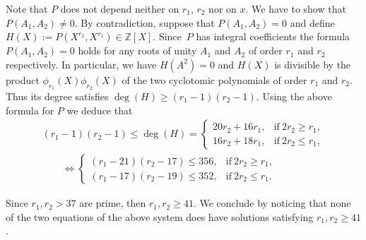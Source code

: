 Note that $P$ does not depend neither on $r_1$, $r_2$ nor on $x$. We have to show that $P(A_1,A_2)\neq 0$. By contradiction, suppose that $P(A_1, A_2)=0$ and define $H(X):=P(X^{r_2}, X^{r_1})\in \mathbb{Z}[X]$. Since~$P$ has integral coefficients the formula $P(A_1,A_2)=0$ holds for any roots of unity $A_1$ and $A_2$ of order $r_1$ and $r_2$ respectively. In particular, we have $H(A^2)=0$ and $H(X)$ is divisible by the product $\phi_{r_1}(X)\phi_{r_2}(X)$ of the two cyclotomic polynomials of order $r_1$ and $r_2$. Thus its degree satisfies $\deg (H) \geq (r_1-1)(r_2-1)$. Using the above formula for $P$ we deduce that
\begin{gather*}
 (r_1-1)(r_2-1) \leq \deg (H) = \begin{cases}
20r_2+16r_1, & \text{if} \ 2r_2\geq r_1, \\
16r_2 +18r_1, &\text{if} \ 2r_2\leq r_1,
\end{cases}\\
\qquad {} \Leftrightarrow
 \begin{cases}
(r_1-21)(r_2-17)\leq 356, & \text{if} \ 2r_2\geq r_1, \\
(r_1-17)(r_2-19)\leq 352, &\text{if} \ 2r_2\leq r_1.
\end{cases}
\end{gather*}

Since $r_1, r_2> 37$ are prime, then $r_1, r_2\geq 41$. We conclude by noticing that none of the two equations of the above system does have solutions satisfying $r_1, r_2\geq 41$.

